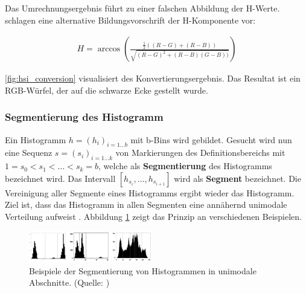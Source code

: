 Das Umrechnungsergebnis führt zu einer falschen Abbildung der H-Werte. \citet{colorimage} schlagen eine alternative Bildungsvorschrift der H-Komponente vor:

\begin{equation}
\begin{split}
H = \arccos{(\frac{\frac{1}{2}((R-G)+(R-B))}{\sqrt{(R-G)^2+(R-B)(G-B))}})}
\end{split}
\label{eq:hsi_colorimage}
\end{equation}


\autoref{fig:hsi_conversion} visualisiert des Konvertierungsergebnis. Das Resultat ist ein RGB-Würfel, der auf die \glqq{}schwarze Ecke gestellt wurde\grqq{}.
 
\subsubsection{Segmentierung des Histogramm}
\label{sec:segmentierung}

Ein Histogramm $h=(h_i)_{i = 1 \ldots b}$ mit b-Bins wird gebildet. Gesucht wird nun eine Sequenz $s = (s_i)_{i = 1 \ldots k}$ von Markierungen des Definitionsbereichs mit $1 = s_0 < s_1 < \ldots < s_k = b$, welche als \textbf{Segmentierung} des Histogramms bezeichnet wird. Das Intervall $[h_{s_i}, \ldots,  h_{s_{i+1}}]$ wird als \textbf{Segment} bezeichnet. Die Vereinigung aller Segmente eines Histogramms ergibt wieder das Histogramm. Ziel ist, dass das Histogramm in allen Segmenten eine \glqq{}annähernd unimodale Verteilung aufweist\grqq{} \citep{acopa}. Abbildung \ref{fig:unimodal} zeigt das Prinzip an verschiedenen Beispielen.

\begin{figure}[h]
\centering
\includegraphics[width=0.48\textwidth]{img/unimodal.png}
\caption{Beispiele der Segmentierung von Histogrammen in unimodale Abschnitte. (Quelle: \citep{acopa})}
\label{fig:unimodal}
\end{figure}

